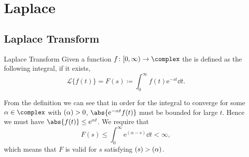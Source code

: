 \documentclass[fleqn]{NotesClass}
\newcommand*{\e}{\mathrm{e}}
\let\Re\relax
\DeclareMathOperator{\Re}{Re}
\newcommand*{\laplaceTransform}{\mathcal{L}}
\begin{document}
    \chapter{Laplace}
    \section{Laplace Transform}
    \begin{dfn}{Laplace Transform}{}
        Given a function \(f \colon [0, \infty) \to \complex\) the  is defined as the following integral, if it exists,
        \begin{equation}
            \laplaceTransform\{ f(t) \} = F(s) \coloneqq \int_{0}^{\infty} f(t)\e^{-st} \dd{t}.
        \end{equation}
    \end{dfn}
    
    From the definition we can see that in order for the integral to converge for some \(\alpha\in\complex\) with \(\Re(\alpha) > 0\), \(\abs{\e^{-\alpha t}f(t)}\) must be bounded for large \(t\).
    Hence we must have \(\abs{f(t)} \le \e^{\alpha t}\).
    We require that
    \begin{equation}
        F(s) \le \int_{0}^{\infty} \e^{(\alpha - s)} \dd{t} < \infty,
    \end{equation}
    which means that \(F\) is valid for \(s\) satisfying \(\Re(s) > \Re(\alpha)\).
    
\end{document}
